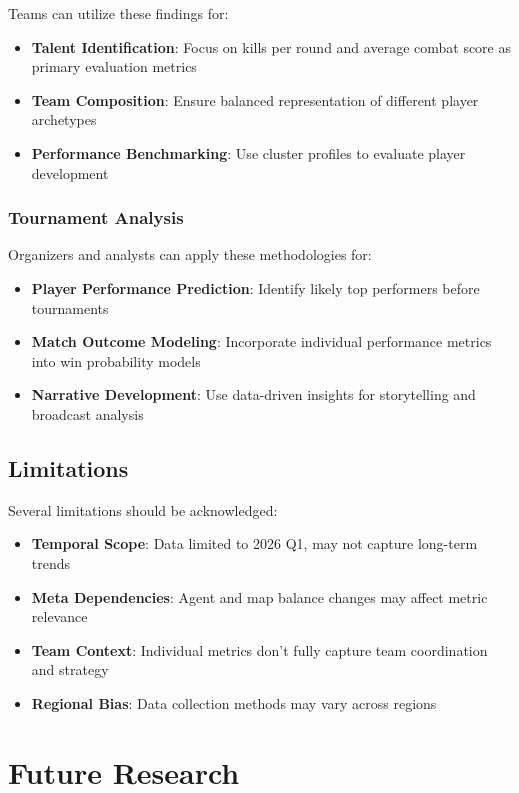 \documentclass[11pt,a4paper]{article}
\begin{document}
Teams can utilize these findings for:
\begin{itemize}
\item \textbf{Talent Identification}: Focus on kills per round and average combat score as primary evaluation metrics
\item \textbf{Team Composition}: Ensure balanced representation of different player archetypes
\item \textbf{Performance Benchmarking}: Use cluster profiles to evaluate player development
\end{itemize}

\subsubsection{Tournament Analysis}

Organizers and analysts can apply these methodologies for:
\begin{itemize}
\item \textbf{Player Performance Prediction}: Identify likely top performers before tournaments
\item \textbf{Match Outcome Modeling}: Incorporate individual performance metrics into win probability models
\item \textbf{Narrative Development}: Use data-driven insights for storytelling and broadcast analysis
\end{itemize}

\subsection{Limitations}

Several limitations should be acknowledged:

\begin{itemize}
\item \textbf{Temporal Scope}: Data limited to 2026 Q1, may not capture long-term trends
\item \textbf{Meta Dependencies}: Agent and map balance changes may affect metric relevance
\item \textbf{Team Context}: Individual metrics don't fully capture team coordination and strategy
\item \textbf{Regional Bias}: Data collection methods may vary across regions
\end{itemize}

\section{Future Research}
\end{document}
